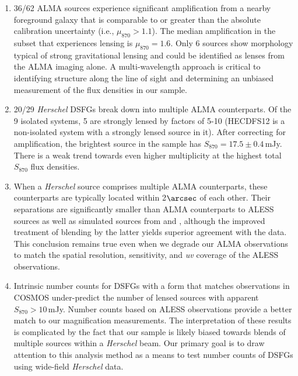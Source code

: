 \documentclass[iop]{emulateapj}
\begin{document}
\begin{enumerate}

    \item 36/62 ALMA sources experience significant amplification from a nearby
        foreground galaxy that is comparable to or greater than the absolute
        calibration uncertainty (i.e., $\mu_{870} > 1.1$).  The median
        amplification in the subset that experiences lensing is $\mu_{870} =
        1.6$.  Only 6 sources show morphology typical of strong gravitational
        lensing and could be identified as lenses from the ALMA imaging alone.
        A multi-wavelength approach is critical to identifying structure along
        the line of sight and determining an unbiased measurement of the flux
        densities in our sample.

    \item 20/29 {\it Herschel} DSFGs break down into multiple ALMA
        counterparts.  Of the 9 isolated systems, 5 are strongly lensed by
        factors of 5-10 (HECDFS12 is a non-isolated system with a strongly
        lensed source in it).  After correcting for amplification, the brightest
        source in the sample has $S_{870} = 17.5 \pm 0.4\,$mJy.  There
        is a weak trend towards even higher multiplicity at the highest total
        $S_{870}$ flux densities.

    \item When a {\it Herschel} source comprises multiple ALMA counterparts,
        these counterparts are typically located within 2$\arcsec$ of each
        other.  Their separations are significantly smaller than ALMA
        counterparts to ALESS sources as well as simulated sources from
        \citet{HB13} and \citet{Cowley:2015lr}, although the improved
        treatment of blending by the latter yields superior agreement with the
        data.  This conclusion remains true even when we degrade our
        ALMA observations to match the spatial resolution, sensitivity, and
        {\it uv} coverage of the ALESS observations.

    \item Intrinsic number counts for DSFGs with a form that matches
        observations in COSMOS \citep{Miettinen:2015lr} under-predict the
        number of lensed sources with apparent $S_{870} > 10\,$mJy.  Number
        counts based on ALESS observations provide a better match
        to our magnification measurements.  The interpretation of these results
        is complicated by the fact that our sample is likely biased towards
        blends of multiple sources within a {\it Herschel} beam.  Our primary
        goal is to draw attention to this analysis method as a means to test
        number counts of DSFGs using wide-field {\it Herschel} data. 

\end{enumerate}
\end{document}
